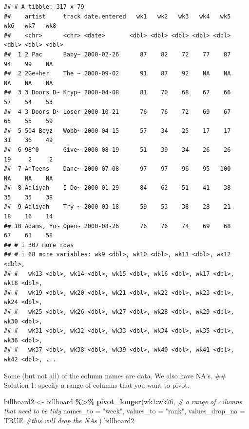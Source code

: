 \documentclass[
]{article}
\newenvironment{Shaded}{\begin{snugshade}}{\end{snugshade}}
\newcommand{\AttributeTok}[1]{\textcolor[rgb]{0.13,0.29,0.53}{#1}}
\newcommand{\CommentTok}[1]{\textcolor[rgb]{0.56,0.35,0.01}{\textit{#1}}}
\newcommand{\ConstantTok}[1]{\textcolor[rgb]{0.56,0.35,0.01}{#1}}
\newcommand{\FunctionTok}[1]{\textcolor[rgb]{0.13,0.29,0.53}{\textbf{#1}}}
\newcommand{\NormalTok}[1]{#1}
\newcommand{\OtherTok}[1]{\textcolor[rgb]{0.56,0.35,0.01}{#1}}
\newcommand{\SpecialCharTok}[1]{\textcolor[rgb]{0.81,0.36,0.00}{\textbf{#1}}}
\newcommand{\StringTok}[1]{\textcolor[rgb]{0.31,0.60,0.02}{#1}}
\begin{document}
\begin{verbatim}
## # A tibble: 317 x 79
##    artist     track date.entered   wk1   wk2   wk3   wk4   wk5   wk6   wk7   wk8
##    <chr>      <chr> <date>       <dbl> <dbl> <dbl> <dbl> <dbl> <dbl> <dbl> <dbl>
##  1 2 Pac      Baby~ 2000-02-26      87    82    72    77    87    94    99    NA
##  2 2Ge+her    The ~ 2000-09-02      91    87    92    NA    NA    NA    NA    NA
##  3 3 Doors D~ Kryp~ 2000-04-08      81    70    68    67    66    57    54    53
##  4 3 Doors D~ Loser 2000-10-21      76    76    72    69    67    65    55    59
##  5 504 Boyz   Wobb~ 2000-04-15      57    34    25    17    17    31    36    49
##  6 98^0       Give~ 2000-08-19      51    39    34    26    26    19     2     2
##  7 A*Teens    Danc~ 2000-07-08      97    97    96    95   100    NA    NA    NA
##  8 Aaliyah    I Do~ 2000-01-29      84    62    51    41    38    35    35    38
##  9 Aaliyah    Try ~ 2000-03-18      59    53    38    28    21    18    16    14
## 10 Adams, Yo~ Open~ 2000-08-26      76    76    74    69    68    67    61    58
## # i 307 more rows
## # i 68 more variables: wk9 <dbl>, wk10 <dbl>, wk11 <dbl>, wk12 <dbl>,
## #   wk13 <dbl>, wk14 <dbl>, wk15 <dbl>, wk16 <dbl>, wk17 <dbl>, wk18 <dbl>,
## #   wk19 <dbl>, wk20 <dbl>, wk21 <dbl>, wk22 <dbl>, wk23 <dbl>, wk24 <dbl>,
## #   wk25 <dbl>, wk26 <dbl>, wk27 <dbl>, wk28 <dbl>, wk29 <dbl>, wk30 <dbl>,
## #   wk31 <dbl>, wk32 <dbl>, wk33 <dbl>, wk34 <dbl>, wk35 <dbl>, wk36 <dbl>,
## #   wk37 <dbl>, wk38 <dbl>, wk39 <dbl>, wk40 <dbl>, wk41 <dbl>, wk42 <dbl>, ...
\end{verbatim}

Some (but not all) of the column names are data. We also have NA's. \#\#
Solution 1: specify a range of columns that you want to pivot.

\begin{Shaded}
\begin{Highlighting}[]
\NormalTok{billboard2 }\OtherTok{\textless{}{-}} 
\NormalTok{  billboard }\SpecialCharTok{\%\textgreater{}\%} 
  \FunctionTok{pivot\_longer}\NormalTok{(wk1}\SpecialCharTok{:}\NormalTok{wk76, }\CommentTok{\# a range of columns that need to be tidy}
               \AttributeTok{names\_to =} \StringTok{"week"}\NormalTok{,}
               \AttributeTok{values\_to =} \StringTok{"rank"}\NormalTok{, }
               \AttributeTok{values\_drop\_na =} \ConstantTok{TRUE} \CommentTok{\#this will drop the NA\textquotesingle{}s}
\NormalTok{               )}
\NormalTok{billboard2}
\end{Highlighting}
\end{Shaded}
\end{document}
